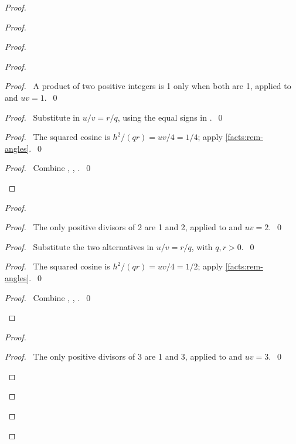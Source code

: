 \begin{proof}
\begin{proof}
\begin{proof}
\begin{proof}
\begin{proof}\pf\ A product of two positive integers is 1 only when
both are 1, applied to  and $uv=1$.~\qed\end{proof}
\begin{proof}\pf\ Substitute  in
$u/v=r/q$, using the equal signs in .~\qed\end{proof}
\begin{proof}\pf\ The squared cosine is $h^2/(qr)=uv/4=1/4$;
apply \ref{facts:rem-angles}.~\qed\end{proof}
\qedstep
\begin{proof}\pf\ Combine ,
, .~\qed\end{proof}
\end{proof}
\begin{proof}
\begin{proof}\pf\ The only positive divisors of 2 are 1 and 2,
applied to  and $uv=2$.~\qed\end{proof}
\begin{proof}\pf\ Substitute the two alternatives
 in $u/v=r/q$, with $q,r>0$.~\qed\end{proof}
\begin{proof}\pf\ The squared cosine is $h^2/(qr)=uv/4=1/2$;
apply \ref{facts:rem-angles}.~\qed\end{proof}
\qedstep
\begin{proof}\pf\ Combine ,
, .~\qed\end{proof}
\end{proof}
\begin{proof}
\begin{proof}\pf\ The only positive divisors of 3 are 1 and 3,
applied to  and $uv=3$.~\qed\end{proof}

\end{proof}
\end{proof}
\end{proof}
\end{proof}
